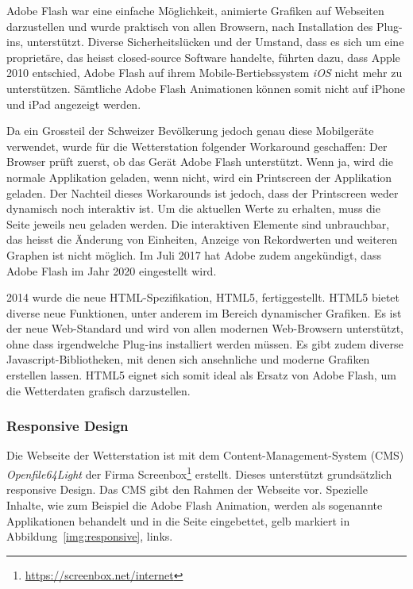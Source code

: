 \noindent
Adobe Flash war eine einfache Möglichkeit, animierte Grafiken auf Webseiten darzustellen und wurde praktisch von allen Browsern, nach Installation des Plug-ins, unterstützt. Diverse Sicherheitslücken und der Umstand, dass es sich um eine proprietäre, das heisst closed-source Software handelte, führten dazu, dass Apple 2010 entschied, Adobe Flash auf ihrem Mobile-Bertiebssystem \textit{iOS} nicht mehr zu unterstützen\cite{Apple:ThoughtsOnFlash}. Sämtliche Adobe Flash Animationen können somit nicht auf iPhone und iPad angezeigt werden.

Da ein Grossteil der Schweizer Bevölkerung jedoch genau diese Mobilgeräte verwendet, wurde für die Wetterstation folgender Workaround geschaffen: Der Browser prüft zuerst, ob das Gerät Adobe Flash unterstützt. Wenn ja, wird die normale Applikation geladen, wenn nicht, wird ein Printscreen der Applikation geladen. Der Nachteil dieses Workarounds ist jedoch, dass der Printscreen weder dynamisch noch interaktiv ist. Um die aktuellen Werte zu erhalten, muss die Seite jeweils neu geladen werden. Die interaktiven Elemente sind unbrauchbar, das heisst die Änderung von Einheiten, Anzeige von Rekordwerten und weiteren Graphen ist nicht möglich. Im Juli 2017 hat Adobe zudem angekündigt, dass Adobe Flash im Jahr 2020 eingestellt wird\cite{Adobe:FlashTheFutureofInteractiveContent}.
\newline

\noindent
2014 wurde die neue HTML-Spezifikation, HTML5, fertiggestellt. HTML5 bietet diverse neue Funktionen, unter anderem im Bereich dynamischer Grafiken. Es ist der neue Web-Standard und wird von allen modernen Web-Browsern unterstützt, ohne dass irgendwelche Plug-ins installiert werden müssen. Es gibt zudem diverse Javascript-Bibliotheken, mit denen sich ansehnliche und moderne Grafiken erstellen lassen. HTML5 eignet sich somit ideal als Ersatz von Adobe Flash, um die Wetterdaten grafisch darzustellen. 


\subsubsection*{Responsive Design}
Die Webseite der Wetterstation ist mit dem Content-Management-System (CMS) \textit{Openfile64Light} der Firma Screenbox\footnote{ \url{https://screenbox.net/internet}}  erstellt. Dieses unterstützt grundsätzlich responsive Design. Das CMS gibt den Rahmen der Webseite vor. Spezielle Inhalte, wie zum Beispiel die Adobe Flash Animation, werden als sogenannte Applikationen behandelt und in die Seite eingebettet, gelb markiert in Abbildung~\ref{img:responsive}, links.
\newline

